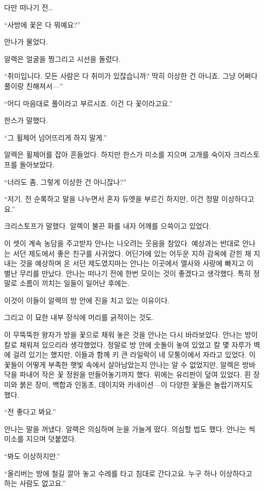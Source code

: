 다만 떠나기 전\ldots

``사방에 꽃은 다 뭐예요?''

안나가 물었다.

알렉은 얼굴을 찡그리고 시선을 돌렸다.

``취미입니다. 모든 사람은 다 취미가 있잖습니까? 딱히 이상한 건 아니죠. 그냥 어쩌다 풀이랑 친해져서—''

``어디 마음대로 풀이라고 부르시죠. 이건 다 꽃이라고요.''

한스가 말했다.

``그 휠체어 넘어뜨리게 하지 말게.''

알렉은 휠체어를 잡아 흔들었다. 하지만 한스가 미소를 지으며 고개를 숙이자 크리스토프를 돌아보았다.

``너라도 좀, 그렇게 이상한 건 아니잖나?''

``저기, 전 순록하고 말을 나누면서 혼자 듀엣을 부르긴 하지만, 이건 정말 이상하다고요.''

크리스토프가 말했다. 알렉이 불끈 화를 내자 어깨를 으쓱이고 있었다.

이 셋이 계속 농담을 주고받자 안나는 나오려는 웃음을 참았다. 예상과는 반대로 안나는 서던 제도에서 좋은 친구를 사귀었다. 어딘가에 있는 어두운 지하 감옥에 갇힌 채 지내는 것을 예상하며 온 서던 제도였지마는 안나는 이곳에서 엘사와 사랑에 빠지고 이 별난 무리를 만났다. 안나는 떠나기 전에 한번 모이는 것이 좋겠다고 생각했다. 특히 정말로 소름이 끼치는 일들이 일어난 후에는.

이것이 이들이 알렉의 방 안에 진을 치고 있는 이유이다.

그리고 이 묘한 내부 장식에 머리를 긁적이는 것도.

이 무뚝뚝한 왕자가 방을 꽃으로 채워 놓은 것을 안나는 다시 바라보았다. 안나는 방이 칼로 채워져 있으리라 생각했었다. 정말로 방 안에 숫돌이 놓여 있었고 칼 몇 자루가 벽에 걸려 있기는 했지만, 이들과 함께 키 큰 라일락이 네 모퉁이에서 자라고 있었다. 이 꽃들이 어떻게 부족한 햇빛 속에서 살아남았는지 안나는 알 수 없었지만, 알렉은 방바닥을 파내어 작은 꽃 정원을 만들어놓기까지 했다. 위에는 유리판이 덮여 있었다. 흰 장미와 붉은 장미, 백합과 인동초, 데이지와 카네이션—이 다양한 꽃들은 놀랍기까지도 했다.

``전 좋다고 봐요.''

안나는 말을 꺼냈다. 알렉은 의심하며 눈을 가늘게 떴다. 의심할 법도 했다. 안나는 씩 미소를 지으며 덧붙였다.

``봐도 이상하지만.''

``올리버는 방에 철길 깔아 놓고 수레를 타고 침대로 간다고요. 누구 하나 이상하다고 하는 사람도 없고요.''

